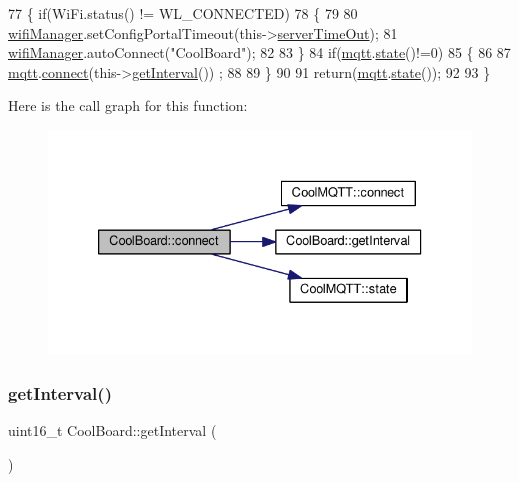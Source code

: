 \begin{DoxyCode}
77 \{   \textcolor{keywordflow}{if}(WiFi.status() != WL\_CONNECTED)
78     \{
79 
80         \hyperlink{classCoolBoard_a55b28656e295140928557c47d7fff01e}{wifiManager}.setConfigPortalTimeout(this->\hyperlink{classCoolBoard_a7a8d8d3d316220cdd049cd63c1aa8fe6}{serverTimeOut});
81         \hyperlink{classCoolBoard_a55b28656e295140928557c47d7fff01e}{wifiManager}.autoConnect(\textcolor{stringliteral}{"CoolBoard"});
82 
83     \}
84     \textcolor{keywordflow}{if}(\hyperlink{classCoolBoard_a2399f44d7c23c1149a335cb3b46d90f1}{mqtt}.\hyperlink{classCoolMQTT_a5d003307eff78efbd585e42b43b72b6d}{state}()!=0)
85     \{   
86 
87         \hyperlink{classCoolBoard_a2399f44d7c23c1149a335cb3b46d90f1}{mqtt}.\hyperlink{classCoolMQTT_a58b0b1f64b269c2681685208262fba1d}{connect}(this->\hyperlink{classCoolBoard_a31cf73a70425114cd7ee49c6e5244199}{getInterval}()) ;
88 
89     \}
90     
91     \textcolor{keywordflow}{return}(\hyperlink{classCoolBoard_a2399f44d7c23c1149a335cb3b46d90f1}{mqtt}.\hyperlink{classCoolMQTT_a5d003307eff78efbd585e42b43b72b6d}{state}()); 
92         
93 \}
\end{DoxyCode}
Here is the call graph for this function\+:
\nopagebreak
\begin{figure}[H]
\begin{center}
\leavevmode
\includegraphics[width=333pt]{classCoolBoard_a519de78b807f8ec6463ff484eb925918_cgraph}
\end{center}
\end{figure}
\mbox{\label{classCoolBoard_a31cf73a70425114cd7ee49c6e5244199}} 
\subsubsection{\texorpdfstring{get\+Interval()}{getInterval()}}
{\footnotesize\ttfamily uint16\+\_\+t Cool\+Board\+::get\+Interval (\begin{DoxyParamCaption}{ }\end{DoxyParamCaption})}


